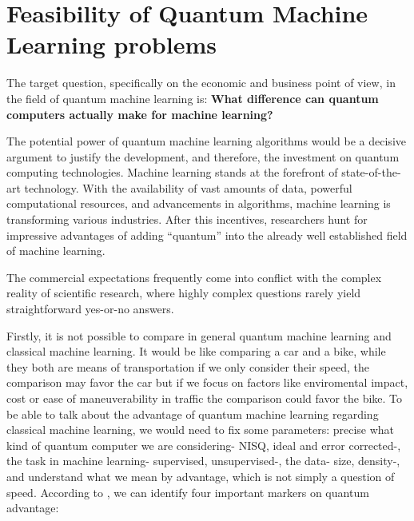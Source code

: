
\chapter{Feasibility of Quantum Machine Learning problems}\label{ch:5- FeasibilityQML}

The target question, specifically on the economic and business point of view, in the field of quantum machine learning is: \textbf{What difference can quantum computers actually make for machine learning?}

The potential power of quantum machine learning algorithms would be a decisive argument to justify the development, and therefore, the investment on quantum computing technologies. Machine learning stands at the forefront of state-of-the-art technology. With the availability of vast amounts of data, powerful computational resources, and advancements in algorithms, machine learning is transforming various industries. After this incentives, researchers hunt for impressive advantages of adding ``quantum'' into the already well established field of machine learning.

The commercial expectations frequently come into conflict with the complex reality of scientific research, where highly complex questions rarely yield straightforward yes-or-no answers. 

Firstly, it is not possible to compare in general quantum machine learning and classical machine learning. It would be like comparing a car and a bike, while they both are means of transportation if we only consider their speed, the comparison may favor the car but if we focus on factors like enviromental impact, cost or ease of maneuverability in traffic the comparison could favor the bike.    To be able to talk about the advantage of quantum machine learning regarding classical machine learning, we would need to fix some parameters: precise what kind of quantum computer we are considering- NISQ, ideal and error corrected-, the task in machine learning- supervised, unsupervised-, the data- size, density-,  and understand what we mean by advantage, which is not simply a question of speed. According to \cite{schuld2021machine}, we can identify four important markers on quantum advantage:

